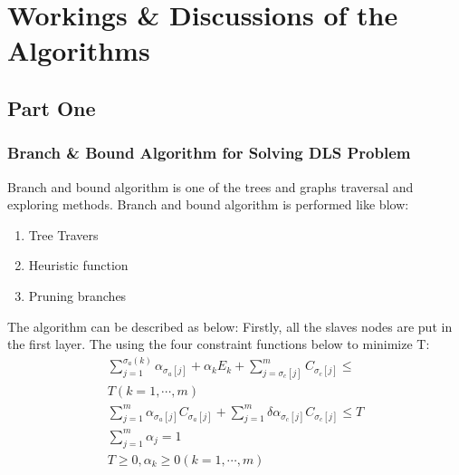 \documentclass[twocolumn]{article}
\begin{document}
\section{Workings \&
Discussions of the
Algorithms}
\subsection{Part One}
\subsubsection{Branch \& Bound Algorithm for Solving DLS Problem}

Branch and bound algorithm is one of the trees and graphs traversal and exploring methods. Branch and bound algorithm is performed like blow:
\begin{enumerate}
\item Tree Travers
\item Heuristic function
\item Pruning branches
\end{enumerate}

The algorithm can be described as below: 
  Firstly, all the slaves nodes are put in the first layer. The using the four constraint functions below to minimize T:
\begin{eqnarray}
\sum^{\sigma_a(k)}_{j=1} \alpha_{\sigma_a[j]} +\alpha_kE_k+\sum^m_{j=\sigma_c[j]}C_{\sigma_c[j]}\le \nonumber\\ T (k=1,⋯,m)\\
\sum_{j=1}^m \alpha_{\sigma_a [j]} C_{\sigma_a [j]}+\sum_{j=1}^m\delta \alpha_{\sigma_c [j]} C_{\sigma_c [j]} \le T\\
\sum_{j=1}^m \alpha_j =1\\
 T\ge 0,\alpha_k\ge 0 (k=1,⋯,m) 
\end{eqnarray}
\end{document}
